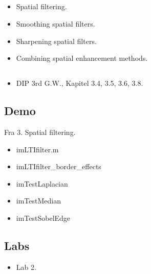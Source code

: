 \subsection{\subtopics}

\begin{itemize}
	\item Spatial filtering.
	\item Smoothing spatial filters.
	\item Sharpening spatial filters.
	\item Combining spatial enhancement methods.
\end{itemize}

\subsection{\curriculum}

\begin{itemize}
	\item DIP 3rd G.W., Kapitel 3.4, 3.5, 3.6, 3.8.
\end{itemize}

\subsection{Demo}

Fra 3. Spatial filtering.

\begin{itemize}
	\item imLTIfilter.m
	\item imLTIfilter\_border\_effects
	\item imTestLaplacian
	\item imTestMedian
	\item imTestSobelEdge
\end{itemize}

\subsection{Labs}

\begin{itemize}
	\item Lab 2.
\end{itemize}